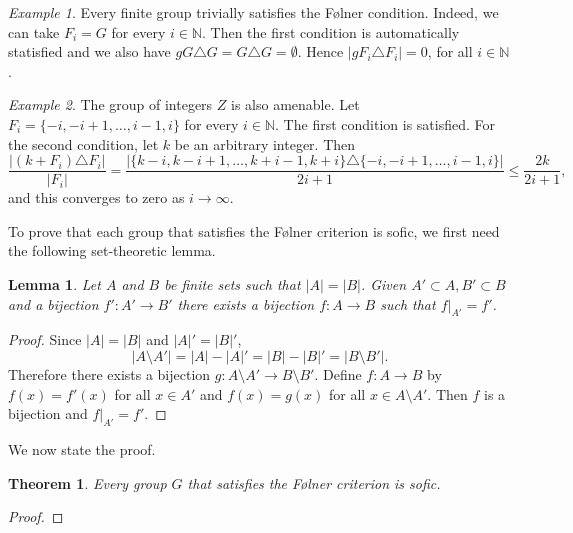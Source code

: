 \documentclass[titlepage, a4paper]{article}
\newcommand{\N}{\mathbb{N}}
\newcommand{\card}[1]{\left| #1 \right|}
\newtheorem{theorem}{Theorem}
\newtheorem{lemma}{Lemma}
\theoremstyle{remark}
\newtheorem{example}{Example}
\begin{document}
\begin{example}\label{ex:finite_group_folner}
    Every finite group trivially satisfies the Følner condition. Indeed, we can take $F_i = G$ for every $i \in \N$. Then the first condition is automatically statisfied and we also have $gG \triangle G = G \triangle G = \emptyset$. Hence $\card{gF_i\triangle F_i} = 0$, for all $i \in \N$.
\end{example}

\begin{example}\label{ex:integers_folner}
    The group of integers $Z$ is also amenable. Let $F_i = \{-i, -i+1, \dots, i-1, i\}$ for every $i \in \N$. The first condition is satisfied. For the second condition, let $k$ be an arbitrary integer. Then
    \[
        \frac{\card{(k + F_i) \triangle F_i}}{\card{F_i}}
        = \frac{\card{\{k-i, k-i+1, \dots, k+i-1, k+i\}\triangle \{-i, -i+1, \dots, i-1, i\}}}{2i+1}
        \leq \frac{2k}{2i+1},
    \]
    and this converges to zero as $i \to \infty$.
\end{example}


To prove that each group that satisfies the Følner criterion is sofic, we first need the following set-theoretic lemma.

\begin{lemma}\label{lem:finite_bijections} 
        Let $A$ and $B$ be finite sets such that $|A| = |B|$. Given $A' \subset A, B' \subset B$ and a bijection $f': A' \to B'$ there exists a bijection $f: A \to B$ such that $f|_{A'} = f'$. 
    \end{lemma}
    \begin{proof}
        Since $\card A = \card B$ and $\card A' = \card B'$,
        \[
        \card{A \setminus A'} = \card A - \card A' = \card B - \card B' = \card{B \setminus B'}.
        \]
        Therefore there exists a bijection $g: A \setminus A' \to B \setminus B'$. Define $f: A  \to B$ by $f(x) = f'(x)$ for all $x \in A'$ and $f(x)=g(x)$ for all $x \in A \setminus A'$. Then $f$ is a bijection and $f|_{A'} = f'$.
    \end{proof}

We now state the proof.

 	\begin{theorem}\label{thm:folner_sofic}
        Every group $G$ that satisfies the Følner criterion is sofic.
    \end{theorem}
    \begin{proof}
        
 	\end{proof}
\end{document}
